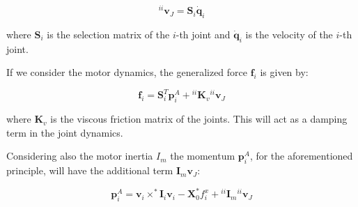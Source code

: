 $$
    {} ^{ii}\mathbf{v} _J = \mathbf{S} _i \dot{\mathbf{q}} _i
$$

where $\mathbf{S} _i$ is the selection matrix of the $i$-th joint and $\dot{\mathbf{q}} _i$ is the velocity of the $i$-th joint.

If we consider the motor dynamics, the generalized force $\mathbf{f} _i$ is given by:

$$
    \mathbf{f} _i = \mathbf{S} ^T _i \mathbf{p} ^A _i + {} ^{ii} \mathbf{K} _v {} ^{ii}\mathbf{v} _J
$$

where $\mathbf{K} _v$ is the viscous friction matrix of the joints. This will act as a damping term in the joint dynamics.

Considering also the motor inertia $I _m$ the momentum $\mathbf{p} ^A _i$, for the aforementioned principle, will have the additional term $\mathbf{I} _m \mathbf{v} _J$:

$$
    \mathbf{p} ^A _i = \mathbf{v} _i \times ^* \mathbf{I} _i \mathbf{v} _i - \mathbf{X} ^* _0 f ^x _i + {} ^{ii}\mathbf{I} _m {} ^{ii}\mathbf{v} _J
$$


